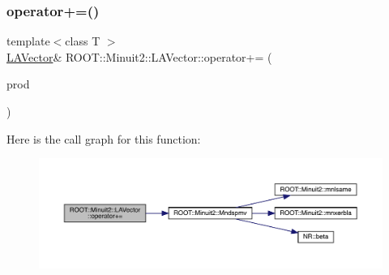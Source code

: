 \subsubsection{\texorpdfstring{operator+=()}{operator+=()}\hspace{0.1cm}{\footnotesize\ttfamily [10/12]}}
{\footnotesize\ttfamily template$<$class T $>$ \\
\mbox{\hyperlink{classROOT_1_1Minuit2_1_1LAVector}{L\+A\+Vector}}\& R\+O\+O\+T\+::\+Minuit2\+::\+L\+A\+Vector\+::operator+= (\begin{DoxyParamCaption}\item[{const \mbox{\hyperlink{classROOT_1_1Minuit2_1_1ABObj}{A\+B\+Obj}}$<$ \mbox{\hyperlink{classROOT_1_1Minuit2_1_1vec}{vec}}, \mbox{\hyperlink{classROOT_1_1Minuit2_1_1ABProd}{A\+B\+Prod}}$<$ \mbox{\hyperlink{classROOT_1_1Minuit2_1_1ABObj}{A\+B\+Obj}}$<$ \mbox{\hyperlink{classROOT_1_1Minuit2_1_1sym}{sym}}, \mbox{\hyperlink{classROOT_1_1Minuit2_1_1LASymMatrix}{L\+A\+Sym\+Matrix}}, T $>$, \mbox{\hyperlink{classROOT_1_1Minuit2_1_1ABObj}{A\+B\+Obj}}$<$ \mbox{\hyperlink{classROOT_1_1Minuit2_1_1vec}{vec}}, \mbox{\hyperlink{classROOT_1_1Minuit2_1_1LAVector}{L\+A\+Vector}}, T $>$ $>$, T $>$ \&}]{prod }\end{DoxyParamCaption})\hspace{0.3cm}{\ttfamily [inline]}}

Here is the call graph for this function\+:
\nopagebreak
\begin{figure}[H]
\begin{center}
\leavevmode
\includegraphics[width=350pt]{d3/d20/classROOT_1_1Minuit2_1_1LAVector_a4372064902da0f6b7028c1da17612825_cgraph}
\end{center}
\end{figure}
\mbox{\label{classROOT_1_1Minuit2_1_1LAVector_a4372064902da0f6b7028c1da17612825}} 
